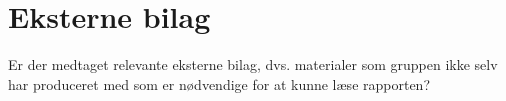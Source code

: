 \chapter{Eksterne bilag}
Er der medtaget relevante eksterne bilag, dvs. materialer som gruppen ikke selv har produceret med som er nødvendige for at kunne læse rapporten?

